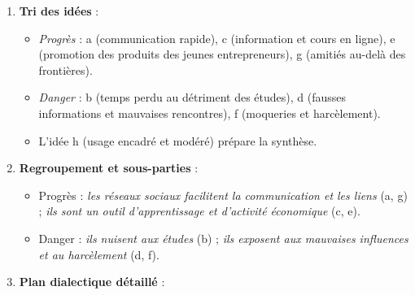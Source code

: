 \documentclass[11pt]{article}
\begin{document}
\begin{corrige}
\begin{enumerate}
\item \textbf{Tri des idées} :
\begin{itemize}
\item \emph{Progrès} : a (communication rapide), c (information et cours en ligne), e (promotion des produits des jeunes entrepreneurs), g (amitiés au-delà des frontières).
\item \emph{Danger} : b (temps perdu au détriment des études), d (fausses informations et mauvaises rencontres), f (moqueries et harcèlement).
\item L'idée h (usage encadré et modéré) prépare la synthèse.
\end{itemize}
\item \textbf{Regroupement et sous-parties} :
\begin{itemize}
\item Progrès : \emph{les réseaux sociaux facilitent la communication et les liens} (a, g) ; \emph{ils sont un outil d'apprentissage et d'activité économique} (c, e).
\item Danger : \emph{ils nuisent aux études} (b) ; \emph{ils exposent aux mauvaises influences et au harcèlement} (d, f).
\end{itemize}
\item \textbf{Plan dialectique détaillé} :


\end{enumerate}
\end{corrige}
\end{document}
